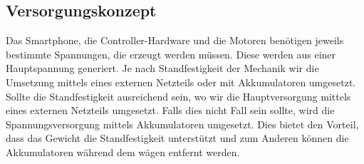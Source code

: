 \subsection{Versorgungskonzept}
	Das Smartphone, die Controller-Hardware und die Motoren benötigen jeweils bestimmte Spannungen, die erzeugt werden müssen. Diese werden aus einer Hauptspannung generiert. Je nach Standfestigkeit der Mechanik wir die Umsetzung mittels eines externen Netzteils oder mit Akkumulatoren umgesetzt. Sollte die Standfestigkeit ausreichend sein, wo wir die Hauptversorgung mittels eines externen Netzteils umgesetzt. Falls dies nicht Fall sein sollte, wird die Spannungsversorgung mittels Akkumulatoren umgesetzt. Dies bietet den Vorteil, dass das Gewicht die Standfestigkeit unterstützt und zum Anderen können die Akkumulatoren während dem wägen entfernt werden.